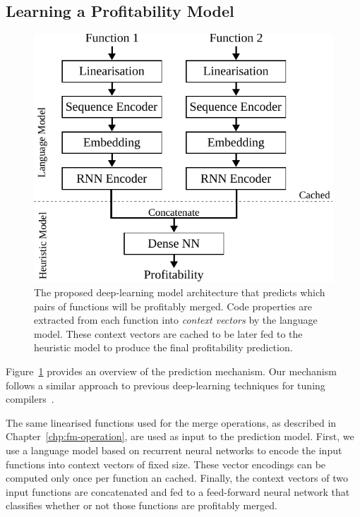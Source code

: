 \subsection{Learning a Profitability Model}

\begin{figure}[h]
  \centering
  \includegraphics[scale=0.85]{src/deeplearning/figs/deeplearning-architecture.pdf}
  \caption{
      The proposed deep-learning model architecture that predicts which pairs of functions will be profitably merged. Code properties are extracted from each function into \textit{context vectors} by the language model.
      These context vectors are cached to be later fed to the heuristic model to produce the final profitability prediction.}
  \label{fig:heuristic-model-architecture}
\end{figure}

Figure~\ref{fig:heuristic-model-architecture} provides an overview of the prediction mechanism.
Our mechanism follows a similar approach to previous deep-learning techniques for tuning compilers~\cite{cummins17, mendis19}.

The same linearised functions used for the merge operations, as described in Chapter~\ref{chp:fm-operation}, are used as input to the prediction model.
First, we use a language model based on recurrent neural networks to encode the input functions into context vectors of fixed size.
These vector encodings can be computed only once per function an cached.
Finally, the context vectors of two input functions are concatenated and fed to a feed-forward neural network that classifies whether or not those functions are profitably merged.

